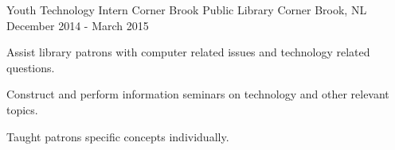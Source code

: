 \begin{cventries}
  \cventry
    {Youth Technology Intern} %
    {Corner Brook Public Library} %
    {Corner Brook, NL} %
    {December 2014 - March 2015} %
    {
      \begin{cvitems} %
        \item {Assist library patrons with computer related issues and technology related questions.}
        \item {Construct and perform information seminars on technology and other relevant topics.}
        \item {Taught patrons specific concepts individually.}
      \end{cvitems}
    }

\end{cventries}
